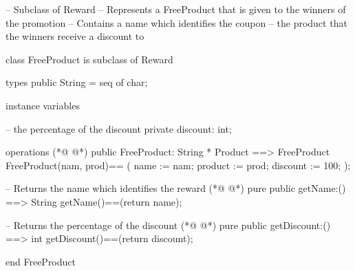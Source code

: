 \begin{vdmpp}[breaklines=true]
-- Subclass of Reward
-- Represents a FreeProduct that is given to the winners of the promotion
-- Contains a name which identifies the coupon
--      the product that the winners receive a discount to

class FreeProduct is subclass of Reward

  types
  public String = seq of char;
  
 instance variables
   
   -- the percentage of the discount
    private discount: int; 
    
  operations 
(*@
\label{FreeProduct:17}
@*)
   public FreeProduct: String * Product ==> FreeProduct
     FreeProduct(nam, prod)==
     (
     name := nam;
     product := prod;
     discount := 100;
     );
     
   -- Returns the name which identifies the reward  
(*@
\label{getName:26}
@*)
   pure public getName:() ==> String
   getName()==(return name);
     
   -- Returns the percentage of the discount
(*@
\label{getDiscount:30}
@*)
   pure public getDiscount:() ==> int
   getDiscount()==(return discount);
   
end FreeProduct
\end{vdmpp}
